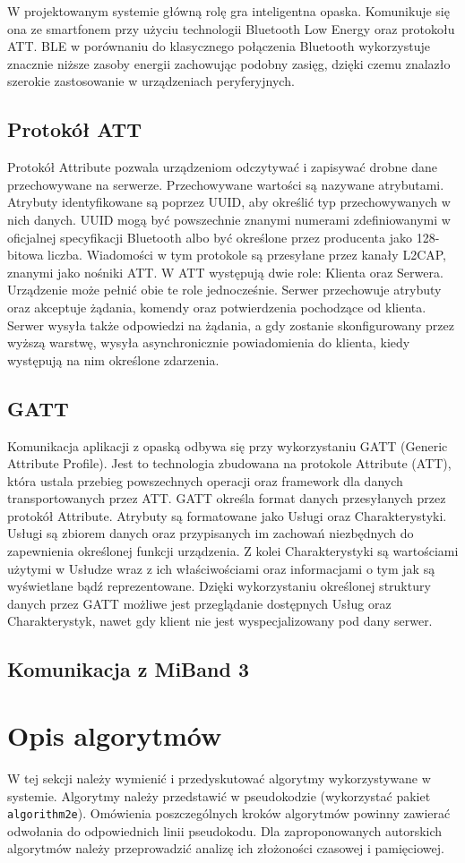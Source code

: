 W projektowanym systemie główną rolę gra inteligentna opaska. Komunikuje się ona ze smartfonem przy użyciu technologii Bluetooth Low Energy oraz protokołu ATT. BLE w porównaniu
do klasycznego połączenia Bluetooth wykorzystuje znacznie niższe zasoby energii zachowując podobny zasięg, dzięki czemu znalazło
szerokie zastosowanie w urządzeniach peryferyjnych.
\subsection{Protokół ATT}
Protokół Attribute pozwala urządzeniom odczytywać i zapisywać drobne dane przechowywane na serwerze.
Przechowywane wartości są nazywane atrybutami. Atrybuty identyfikowane są poprzez
UUID, aby określić typ przechowywanych w nich danych. UUID mogą być powszechnie znanymi
numerami zdefiniowanymi w oficjalnej specyfikacji Bluetooth albo być
określone przez producenta jako 128-bitowa liczba. Wiadomości w tym
protokole są przesyłane przez kanały L2CAP, znanymi jako nośniki ATT. W ATT
występują dwie role: Klienta oraz Serwera. Urządzenie może pełnić obie te role
jednocześnie. Serwer przechowuje atrybuty oraz akceptuje żądania, komendy
oraz potwierdzenia pochodzące od klienta. Serwer wysyła także odpowiedzi na
żądania, a gdy zostanie skonfigurowany przez wyższą warstwę, wysyła asynchronicznie powiadomienia
do klienta, kiedy występują na nim określone zdarzenia.
\subsection{GATT}
Komunikacja aplikacji z opaską odbywa się przy wykorzystaniu GATT (Generic Attribute Profile). Jest to technologia zbudowana na protokole Attribute (ATT), która
ustala przebieg powszechnych operacji oraz framework dla danych transportowanych przez ATT.
GATT określa format danych przesyłanych przez protokół Attribute. Atrybuty są
formatowane jako Usługi oraz Charakterystyki. Usługi są zbiorem danych oraz
przypisanych im zachowań niezbędnych do zapewnienia określonej funkcji urządzenia.
Z kolei Charakterystyki są wartościami użytymi w Usłudze wraz z ich właściwościami
oraz informacjami o tym jak są wyświetlane bądź reprezentowane. Dzięki
wykorzystaniu określonej struktury danych przez GATT możliwe jest przeglądanie
dostępnych Usług oraz Charakterystyk, nawet gdy klient nie jest wyspecjalizowany
pod dany serwer.
\subsection{Komunikacja z MiBand 3}


\section{Opis algorytmów}

W tej sekcji należy wymienić i przedyskutować algorytmy wykorzystywane w systemie. Algorytmy należy przedstawić w pseudokodzie (wykorzystać pakiet \texttt{algorithm2e}). Omówienia poszczególnych kroków algorytmów powinny zawierać odwołania do odpowiednich linii pseudokodu. Dla zaproponowanych autorskich algorytmów należy przeprowadzić analizę ich złożoności czasowej i pamięciowej.
